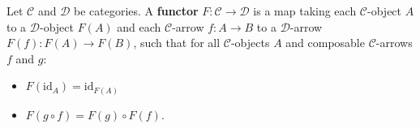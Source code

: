 \begin{definition}
    \label{def:functor}
    Let $\mathcal{C}$ and $\mathcal{D}$ be categories. A \textbf{functor} $F : \mathcal{C} \to \mathcal{D}$ is a map taking each $\mathcal{C}$-object $A$ to a $\mathcal{D}$-object $F(A)$ and each $\mathcal{C}$-arrow $f : A \to B$ to a $\mathcal{D}$-arrow $F(f) : F(A) \to F(B)$, such that for all $\mathcal{C}$-objects $A$ and composable $\mathcal{C}$-arrows $f$ and $g$:
    \begin{itemize}
        \item $F(\mathrm{id}_A) = \mathrm{id}_{F(A)}$
        \item $F(g \circ f) = F(g) \circ F(f)$.
    \end{itemize}
\end{definition}